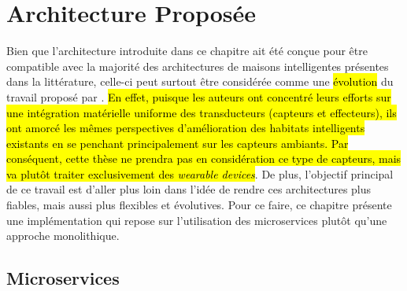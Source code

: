 \section{Architecture Proposée}

Bien que l'architecture introduite dans ce chapitre ait été conçue pour être compatible avec la majorité des architectures de maisons intelligentes présentes dans la littérature, celle-ci peut surtout être considérée comme une \hl{évolution} du travail proposé par \cite{Plantevin2018}. \hl{En effet, puisque les auteurs ont concentré leurs efforts sur une intégration matérielle uniforme des transducteurs (capteurs et effecteurs), ils ont amorcé les mêmes perspectives d'amélioration des habitats intelligents existants en se penchant principalement sur les capteurs ambiants. Par conséquent, cette thèse ne prendra pas en considération ce type de capteurs, mais va plutôt traiter exclusivement des \textit{wearable devices}}. De plus, l'objectif principal de ce travail est d'aller plus loin dans l'idée de rendre ces architectures plus fiables, mais aussi plus flexibles et évolutives. Pour ce faire, ce chapitre présente une implémentation qui repose sur l'utilisation des microservices plutôt qu'une approche monolithique.

\subsection{Microservices}

